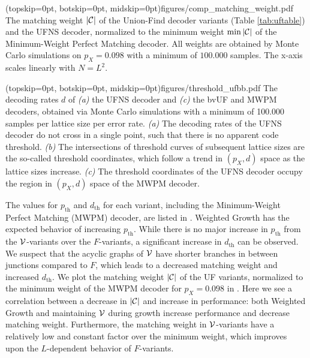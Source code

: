 \Figure[b!](topskip=0pt, botskip=0pt, midskip=0pt){figures/comp_matching_weight.pdf}{
  The matching weight $\lvert\mathcal{C}\rvert$ of the Union-Find decoder variants (Table \ref{tab:uftable}) and the UFNS decoder, normalized to the minimum weight $\min{\lvert\mathcal{C}\rvert}$ of the Minimum-Weight Perfect Matching decoder. All weights are obtained by Monte Carlo simulations on $p_X=0.098$ with a minimum of $100.000$ samples. The x-axis scales linearly with $N = L^2$. \label{comp_weight}}

\Figure[htb](topskip=0pt, botskip=0pt, midskip=0pt){figures/threshold_ufbb.pdf}{
  The decoding rates $d$ of \emph{(a)} the UFNS decoder and \emph{(c)} the bvUF and MWPM decoders, obtained via Monte Carlo simulations with a minimum of 100.000 samples per lattice size per error rate. \emph{(a)} The decoding rates of the UFNS decoder do not cross in a single point, such that there is no apparent code threshold. \emph{(b)} The intersections of threshold curves of subsequent lattice sizes are the so-called threshold coordinates, which follow a trend in $(p_X, d)$ space as the lattice sizes increase. \emph{(c)} The threshold coordinates of the UFNS decoder occupy the region in $(p_X, d)$ space of the MWPM decoder. \label{threshold_ufbb}}

The values for $p_{\text{th}}$ and $d_{\text{th}}$ for each variant, including the Minimum-Weight Perfect Matching (MWPM) decoder, are listed in . Weighted Growth has the expected behavior of increasing $p_{\text{th}}$. While there is no major increase in $p_{\text{th}}$ from the $\mathcal{V}$-variants over the $F$-variants, a significant increase in $d_{\text{th}}$ can be observed. We suspect that the acyclic graphs of $\mathcal{V}$ have shorter branches in between junctions compared to $F$, which leads to a decreased matching weight and increased $d_{\text{th}}$. We plot the matching weight $\lvert\mathcal{C}\rvert$ of the UF variants, normalized to the minimum weight of the MWPM decoder for $p_X = 0.098$ in . Here we see a correlation between a decrease in $\lvert\mathcal{C}\rvert$ and increase in performance: both Weighted Growth and maintaining $\mathcal{V}$ during growth increase performance and decrease matching weight. Furthermore, the matching weight in $\mathcal{V}$-variants have a relatively low and constant factor over the minimum weight, which improves upon the $L$-dependent behavior of $F$-variants.

